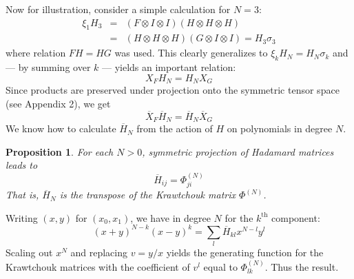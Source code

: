 \documentclass[12pt]{article}    %
\newtheorem{proposition}[thm]{Proposition}
\def\qed{\qquad\framebox[7pt]\medskip\noindent}
\def\FFF#1#2{\Phi^{(#1)}_{#2}}
\newenvironment{proof}{{\sl Proof:}\quad}{\hfill{\qed}\\ \noindent}
\begin{document}
Now for illustration, consider a simple calculation for $N=3$:
%
\begin{eqnarray*}
\xi_1H_3 &=& (F\otimes I\otimes I)(H\otimes H\otimes H)\\
         &=& (H\otimes H\otimes H)(G\otimes I\otimes I)
              = H_3\sigma_3
\end{eqnarray*}
%
where relation $FH=HG$ was used. 
This clearly generalizes to $\xi_kH_N=H_N\sigma_k$ and 
--- by summing over $k$ --- yields an important relation:
$$
            X_F H_N = H_N X_G
$$
Since products are preserved under projection onto 
the symmetric tensor space (see Appendix 2), we get
$$
       \overline{X}_F\overline{H}_N = \overline{H}_N \overline{X}_G
$$
We know how to calculate $\overline{H}_N$ from the action of $H$ on
polynomials in degree $N$. 

\begin{proposition} For each $N>0$, symmetric projection of Hadamard 
matrices leads to 
$$ 
    \overline{H}_{ij} = \FFF{N}{ji}
$$
That is, $\overline{H}_N$ is the transpose of the Krawtchouk matrix
$\FFF{N}{}$.
\end{proposition}

\begin{proof}
Writing $(x,y)$ for $(x_0,x_1)$, we have in degree $N$ for the 
$k^{\mathrm{th}}$ component:
$$
        (x+y)^{N-k}(x-y)^k=\sum_l \overline{H}_{kl} x^{N-l}y^l
$$
Scaling out $x^N$ and replacing $v=y/x$ yields
the generating function for the Krawtchouk matrices with the
coefficient of $v^l$ equal to $\FFF{N}{lk}$. Thus the result.
\end{proof}
\end{document}
